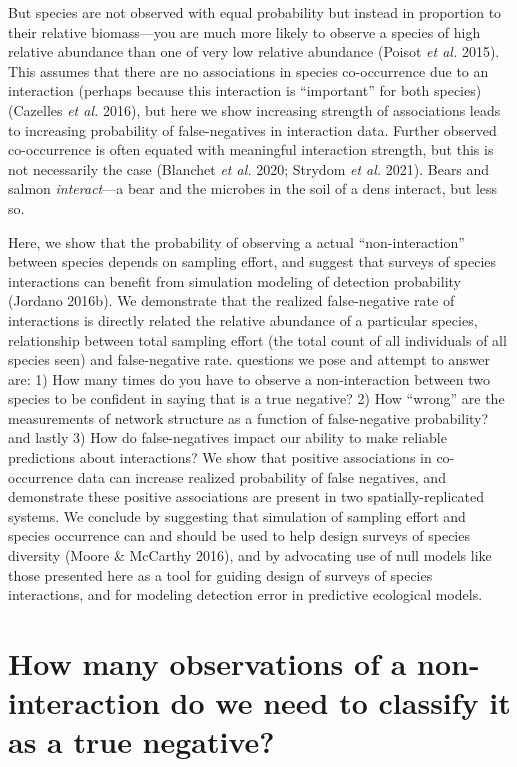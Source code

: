 \documentclass[11pt]{article}
\begin{document}
But species are not observed with equal probability but instead in
proportion to their relative biomass---you are much more likely to
observe a species of high relative abundance than one of very low
relative abundance (Poisot \emph{et al.} 2015). This assumes that there
are no associations in species co-occurrence due to an interaction
(perhaps because this interaction is ``important'' for both species)
(Cazelles \emph{et al.} 2016), but here we show increasing strength of
associations leads to increasing probability of false-negatives in
interaction data. Further observed co-occurrence is often equated with
meaningful interaction strength, but this is not necessarily the case
(Blanchet \emph{et al.} 2020; Strydom \emph{et al.} 2021). Bears and
salmon \emph{interact}---a bear and the microbes in the soil of a dens
interact, but less so.

Here, we show that the probability of observing a actual
``non-interaction'' between species depends on sampling effort, and
suggest that surveys of species interactions can benefit from simulation
modeling of detection probability (Jordano 2016b). We demonstrate that
the realized false-negative rate of interactions is directly related the
relative abundance of a particular species, relationship between total
sampling effort (the total count of all individuals of all species seen)
and false-negative rate. questions we pose and attempt to answer are: 1)
How many times do you have to observe a non-interaction between two
species to be confident in saying that is a true negative? 2) How
``wrong'' are the measurements of network structure as a function of
false-negative probability? and lastly 3) How do false-negatives impact
our ability to make reliable predictions about interactions? We show
that positive associations in co-occurrence data can increase realized
probability of false negatives, and demonstrate these positive
associations are present in two spatially-replicated systems. We
conclude by suggesting that simulation of sampling effort and species
occurrence can and should be used to help design surveys of species
diversity (Moore \& McCarthy 2016), and by advocating use of null models
like those presented here as a tool for guiding design of surveys of
species interactions, and for modeling detection error in predictive
ecological models.

\hypertarget{how-many-observations-of-a-non-interaction-do-we-need-to-classify-it-as-a-true-negative}{%
\section{How many observations of a non-interaction do we need to
classify it as a true
negative?}\label{how-many-observations-of-a-non-interaction-do-we-need-to-classify-it-as-a-true-negative}}
\end{document}
